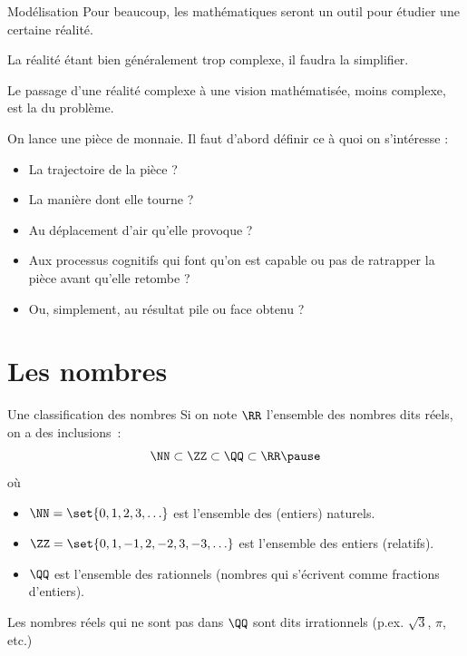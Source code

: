 \documentclass[french,xcolor=svgnames]{beamer}
\begin{document}
\begin{frame}{Modélisation}
  Pour beaucoup, les mathématiques seront un outil pour étudier une certaine réalité.\pause{}

  La réalité étant bien généralement trop complexe, il faudra la simplifier.\pause

  Le passage d'une réalité complexe\pause{} à une vision mathématisée\pause{}, moins complexe,\pause{} est la  du problème.\pause

  \begin{example}
    \og On lance une pièce de monnaie.\fg{} Il faut d'abord définir ce à quoi on s'intéresse :
    \begin{itemize}[<+->]
    \item La trajectoire de la pièce ?
    \item La manière dont elle tourne ?
    \item Au déplacement d'air qu'elle provoque ?
    \item Aux processus cognitifs qui font qu'on est capable ou pas de ratrapper la pièce avant qu'elle retombe ?
    \item Ou, simplement, au résultat \og pile\fg{} ou \og face\fg{} obtenu ?
    \end{itemize}
  \end{example}
\end{frame}

\section{Les nombres}
\begin{frame}{Une classification des nombres}
  Si on note \(\RR\) l'ensemble des nombres dits \og réels\fg{}\pause{}, on a des inclusions~:\pause{}
  \begin{equation*}
    \NN \subset \ZZ \subset  \QQ \subset \RR\pause
  \end{equation*}
  où
  \begin{itemize}[<+->]
  \item \(\NN = \set{0, 1, 2, 3, \ldots}\) est l'ensemble des (entiers) naturels.
  \item \(\ZZ = \set{0, 1, -1, 2,-2, 3,-3, \ldots}\) est l'ensemble des entiers (relatifs).
  \item \(\QQ\) est l'ensemble des rationnels (nombres qui s'écrivent comme fractions d'entiers).
  \end{itemize}\pause
  Les nombres réels qui ne sont pas dans \(\QQ\) sont dits \og irrationnels\fg{} (p.ex. \(\sqrt{3}\), \(\pi\), etc.)
\end{frame}
\end{document}
